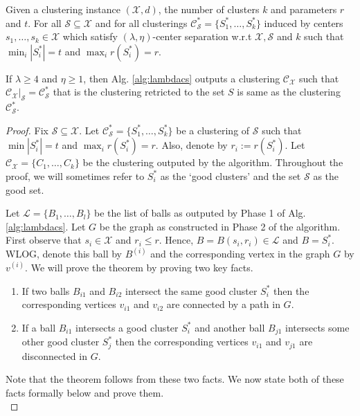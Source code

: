 \documentclass[11pt]{article}
\newcommand{\mc}{\mathcal}
\begin{document}
\begin{theorem}
\label{thm:lambdacsnoise}
Given a clustering instance $(\mc X, d)$, the number of clusters $k$ and parameters $r$ and $t$. For all $\mc S \subseteq \mc X$ and for all clusterings $\mc C^*_{\mc S} = \{S_1^*, \ldots, S_k^*\}$ induced by centers $s_1, \ldots, s_k \in \mc X$ which satisfy $(\lambda, \eta)$-center separation w.r.t $\mc X, \mc S$ and $k$ such that $ \min_i|S_i^*| = t$ and $\max_i r(S_i^*) = r$.

If $\lambda \ge 4$ and $\eta \ge 1$, then Alg. \ref{alg:lambdacs} outputs a clustering $\mc C_{\mc X}$ such that $\mc C_{\mc X}|_{\mc S} = \mc C_{\mc S}^*$ that is the clustering retricted to the set $S$ is same as the clustering $\mc C_{\mc S}^*$.
\end{theorem}
\begin{proof}
Fix $\mc S \subseteq \mc X$. Let $\mc C_{\mc S}^* = \{S_1^*, \ldots, S_k^*\}$ be a clustering of $\mc S$ such that $\min |S_i^*| = t$ and $\max_i r(S_i^*) = r$. Also, denote by $r_i := r(S_i^*)$. Let $\mc C_{\mc X} = \{C_1, \ldots, C_k\}$ be the clustering outputed by the algorithm. Throughout the proof, we will sometimes refer to $S_i^*$ as the `good clusters' and the set $\mc S$ as the good set.

Let $\mc L = \{B_1, \ldots, B_l\}$ be the list of balls as outputed by Phase 1 of Alg. \ref{alg:lambdacs}. Let $G$ be the graph as constructed in Phase 2 of the algorithm. First observe that $s_i \in \mc X$ and $r_i \le r$. Hence, $B = B(s_i, r_i) \in \mc L$ and $B = S_i^*$. WLOG, denote this ball by $B^{(i)}$ and the corresponding vertex in the graph $G$ by $v^{(i)}$. We will prove the theorem by proving two key facts.  

\begin{enumerate}[nolistsep, noitemsep, label=\textbf{F.\arabic*}]
\renewcommand\labelitemi{$\diamond$}
\item \label{fact:lambda1} If two balls $B_{i1}$ and $B_{i2}$ intersect the same good cluster $S_i^*$ then the corresponding vertices $v_{i1}$ and $v_{i2}$ are connected by a path in $G$.
\item \label{fact:lambda2} If a ball $B_{i1}$ intersects a good cluster $S_i^*$ and another ball $B_{j1}$ intersects some other good cluster $S_j^*$ then the corresponding vertices $v_{i1}$ and $v_{j1}$ are disconnected in $G$.	
\end{enumerate}
Note that the theorem follows from these two facts. We now state both of these facts formally below and prove them.\\


\end{proof}
\end{document}
